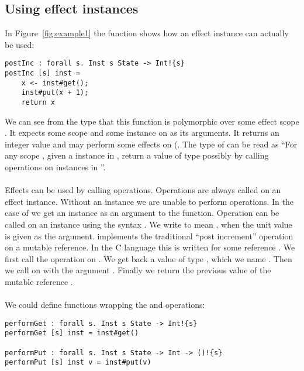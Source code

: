 \subsection{Using effect instances}
\label{subsection:instances}
In Figure~\ref{fig:example1} the function  shows how an effect instance can actually be used:
\begin{verbatim}
postInc : forall s. Inst s State -> Int!{s}
postInc [s] inst =
	x <- inst#get();
	inst#put(x + 1);
	return x
\end{verbatim}

We can see from the type that this function is polymorphic over some effect scope .
It expects some scope  and some  instance on  as its arguments.
It returns an integer value and may perform some effects on  (.
The type of  can be read as ``For any scope , given a  instance in , return a value of type  possibly by calling operations on instances in ''.
\\\\
Effects can be used by calling operations.
Operations are always called on an effect instance.
Without an instance we are unable to perform operations.
In the case of  we get an instance as an argument to the function.
Operation can be called on an instance using the syntax .
We write  to mean , when the unit value \ident{()} is given as the argument.
 implements the traditional ``post increment'' operation on a mutable reference.
In the C language this is written  for some reference .
We first call the  operation on .
We get back a value of type , which we name .
Then we call  on  with the argument .
Finally we return the previous value of the mutable reference .
\\\\
We could define functions wrapping the  and  operations:

\begin{verbatim}
performGet : forall s. Inst s State -> Int!{s}
performGet [s] inst = inst#get()

performPut : forall s. Inst s State -> Int -> ()!{s}
performPut [s] inst v = inst#put(v)
\end{verbatim}

